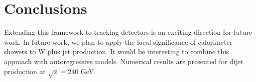 \section{Conclusions}\label{sec:conclusions}

Extending this framework to tracking detectors is an exciting direction
for future work. In future work, we plan to apply the local significance
of calorimeter showers to W plus jet production. It would be interesting
to combine this approach with autoregressive models. Numerical results
are presented for dijet production at $\sqrt{s} = 240$ GeV.

